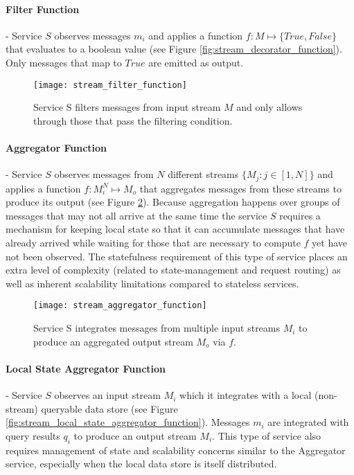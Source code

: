 \paragraph{Filter Function} - Service $S$ observes messages $m_i$ and applies a function $f:M\mapsto\{True,False\}$ that evaluates to a boolean value (see Figure \ref{fig:stream_decorator_function}). Only messages that map to $True$ are emitted as output.

\begin{figure}[H]
\texttt{[image: stream\_filter\_function]}
\centering
\caption {Service S filters messages from input stream $M$ and only allows through those that pass the filtering condition.}
\label{fig:stream_filter_function}
\end{figure}

\paragraph{Aggregator Function} - Service $S$ observes messages from $N$ different streams $\{M_j: j \in [1,N]\}$ and applies a function $f:M_i^N \mapsto M_o$ that aggregates messages from these streams to produce its output (see Figure \ref{fig:stream_aggregator_function}). Because aggregation happens over groups of messages that may not all arrive at the same time the service $S$ requires a mechanism for keeping local state so that it can accumulate messages that have already arrived while waiting for those that are necessary to compute $f$ yet have not been observed. The statefulness requirement of this type of service places an extra level of complexity (related to state-management and request routing) as well as inherent scalability limitations compared to stateless services\autocite{oppenheimer2002architecture}.

\begin{figure}[H]
\texttt{[image: stream\_aggregator\_function]}
\centering
\caption {Service S integrates messages from multiple input streams $M_i$ to produce an aggregated output stream $M_o$ via $f$.}
\label{fig:stream_aggregator_function}
\end{figure}


\paragraph{Local State Aggregator Function} - Service $S$ observes an input stream $M_i$ which it integrates with a local (non-stream) queryable data store (see Figure \ref{fig:stream_local_state_aggregator_function}). Messages $m_i$ are integrated with query results $q_i$ to produce an output stream $M_i$. This type of service also requires management of state and scalability concerns similar to the Aggregator service, especially when the local data store is itself distributed. 

